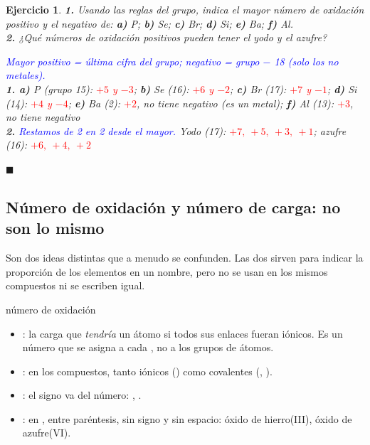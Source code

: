 \documentclass[12pt]{article}
\theoremstyle{mygreennumbox}
\newtheorem{ejercicioT}{Ejercicio}[section]
\newenvironment{exercise}{\begin{eBoxmygreen}\begin{ejercicioT}}{\hfill{\color{mygreen}\tiny\ensuremath{\blacksquare}}\end{ejercicioT}\end{eBoxmygreen}}
\newcommand{\etiquetanom}[2]{\tcbox[on line, colback=#1!10, colframe=#1, boxrule=0.5pt, arc=2pt, boxsep=0pt, left=2pt, right=2pt, top=0.5pt, bottom=0.5pt]{\scriptsize\sffamily\bfseries\textcolor{#1}{#2}}}
\newcommand{\conox}{\etiquetanom{colornumox}{nº de oxidación}}
\begin{document}
\begin{exercise}
    \textbf{1.} Usando las reglas del grupo, indica el mayor número de oxidación positivo y el negativo de: \textbf{a)} P; \textbf{b)} Se; \textbf{c)} Br; \textbf{d)} Si; \textbf{e)} Ba; \textbf{f)} Al.\\
    \textbf{2.} ¿Qué números de oxidación positivos pueden tener el yodo y el azufre?
    \begin{solu}
        \textcolor{blue}{Mayor positivo = última cifra del grupo; negativo = grupo \(-\) 18 (solo los no metales).}\\
        \textbf{1. a)} P (grupo 15): \textcolor{red}{\(+5\) y \(-3\)}; \textbf{b)} Se (16): \textcolor{red}{\(+6\) y \(-2\)}; \textbf{c)} Br (17): \textcolor{red}{\(+7\) y \(-1\)}; \textbf{d)} Si (14): \textcolor{red}{\(+4\) y \(-4\)}; \textbf{e)} Ba (2): \textcolor{red}{\(+2\)}, no tiene negativo (es un metal); \textbf{f)} Al (13): \textcolor{red}{\(+3\)}, no tiene negativo\\
        \textbf{2.} \textcolor{blue}{Restamos de 2 en 2 desde el mayor.} Yodo (17): \textcolor{red}{\(+7,\ +5,\ +3,\ +1\)}; azufre (16): \textcolor{red}{\(+6,\ +4,\ +2\)}
    \end{solu}
\end{exercise}

\subsection{Número de oxidación y número de carga: no son lo mismo}\label{sec:noxcarga}

Son dos ideas distintas que a menudo se confunden. Las dos sirven para indicar la proporción de los elementos en un nombre, pero no se usan en los mismos compuestos ni se escriben igual.

\begin{definicion}{número de oxidación \conox}
    \begin{itemize}
        \item {}: la carga que \emph{tendría} un átomo si todos sus enlaces fueran iónicos. Es un número que se asigna a cada , no a los grupos de átomos.
        \item {}: en  los compuestos, tanto iónicos () como covalentes (, ).
        \item {}: el signo va  del número: , .
        \item {}: en , entre paréntesis, sin signo y sin espacio: óxido de hierro(III), óxido de azufre(VI).
    \end{itemize}
\end{definicion}
\end{document}
